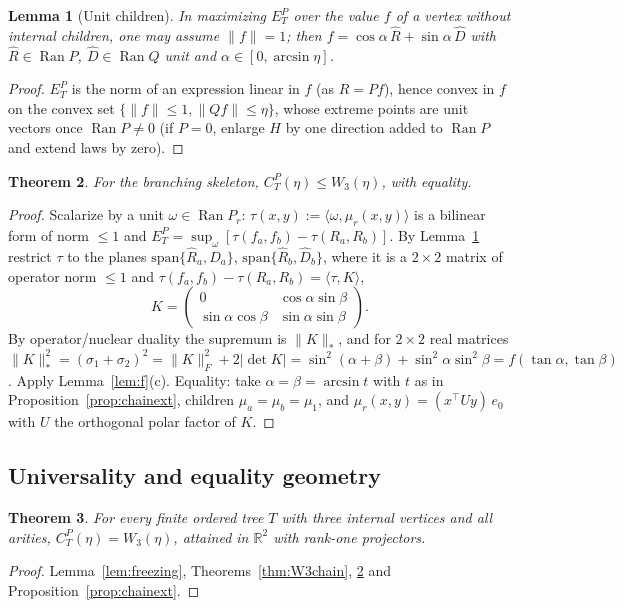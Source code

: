 \documentclass[11pt]{amsart}
\newtheorem{theorem}{Theorem}[section]
\newtheorem{lemma}[theorem]{Lemma}
\theoremstyle{definition}
\newcommand{\R}{\mathbb{R}}
\newcommand{\Ran}{\operatorname{Ran}}
\newcommand{\norm}[1]{\lVert #1\rVert}
\newcommand{\ip}[2]{\langle #1,#2\rangle}
\begin{document}
\begin{lemma}[Unit children]\label{lem:unit}
In maximizing $E^P_T$ over the value $f$ of a vertex without internal children, one
may assume $\norm f=1$; then $f=\cos\alpha\,\hat R+\sin\alpha\,\hat D$ with $\hat R\in\Ran P$,
$\hat D\in\Ran Q$ unit and $\alpha\in[0,\arcsin\eta]$.
\end{lemma}
\begin{proof}
$E^P_T$ is the norm of an expression linear in $f$ (as $R=Pf$), hence convex in $f$
on the convex set $\{\norm f\le1,\norm{Qf}\le\eta\}$, whose extreme points are unit
vectors once $\Ran P\ne0$ (if $P=0$, enlarge $H$ by one direction added to $\Ran P$ and
extend laws by zero).
\end{proof}

\begin{theorem}\label{thm:W3branch}
For the branching skeleton, $C^P_T(\eta)\le W_3(\eta)$, with equality.
\end{theorem}
\begin{proof}
Scalarize by a unit $\omega\in\Ran P_r$: $\tau(x,y):=\ip\omega{\mu_r(x,y)}$ is a
bilinear form of norm $\le1$ and $E_T^P=\sup_\omega[\tau(f_a,f_b)-\tau(R_a,R_b)]$. By
Lemma~\ref{lem:unit} restrict $\tau$ to the planes $\mathrm{span}\{\hat R_a,\hat D_a\}$,
$\mathrm{span}\{\hat R_b,\hat D_b\}$, where it is a $2\times2$ matrix of operator norm
$\le1$ and $\tau(f_a,f_b)-\tau(R_a,R_b)=\ip{\tau}{K}$,
\[
K=\begin{pmatrix}0&\cos\alpha\sin\beta\\ \sin\alpha\cos\beta&\sin\alpha\sin\beta\end{pmatrix}.
\]
By operator/nuclear duality the supremum is $\norm K_*$, and for $2\times2$ real
matrices $\norm K_*^2=(\sigma_1+\sigma_2)^2=\norm K_F^2+2\lvert\det K\rvert
=\sin^2(\alpha+\beta)+\sin^2\alpha\sin^2\beta=f(\tan\alpha,\tan\beta)$. Apply
Lemma~\ref{lem:f}(c). Equality: take $\alpha=\beta=\arcsin t$ with $t$ as in
Proposition~\ref{prop:chainext}, children $\mu_a=\mu_b=\mu_1$, and
$\mu_r(x,y)=(x^\top Uy)\,e_0$ with $U$ the orthogonal polar factor of $K$.
\end{proof}

\subsection{Universality and equality geometry}

\begin{theorem}\label{thm:W3universal}
For every finite ordered tree $T$ with three internal vertices and all arities,
$C^P_T(\eta)=W_3(\eta)$, attained in $\R^2$ with rank-one projectors.
\end{theorem}
\begin{proof}
Lemma~\ref{lem:freezing}, Theorems~\ref{thm:W3chain}, \ref{thm:W3branch} and
Proposition~\ref{prop:chainext}.
\end{proof}
\end{document}
